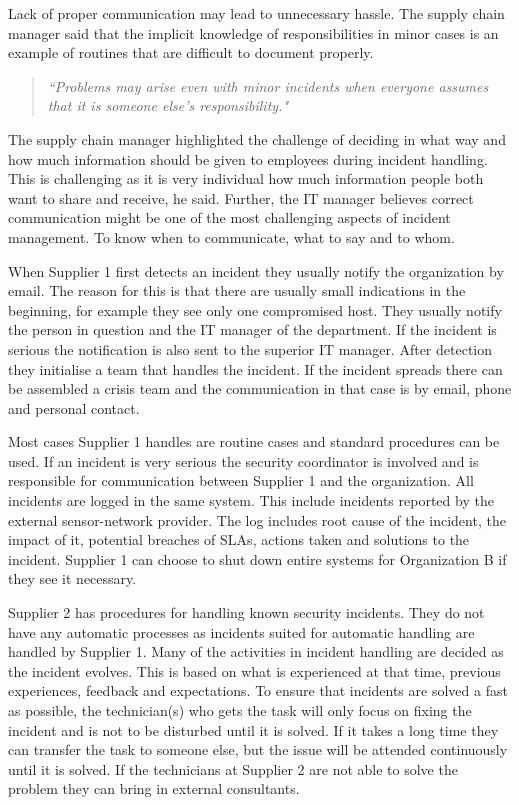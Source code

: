 \documentclass[b5paper, twoside, openright, 11pt]{report}
\begin{document}
Lack of proper communication may lead to unnecessary hassle. The supply chain manager said that the implicit knowledge of responsibilities in minor cases is an example of routines that are difficult to document properly.

\begin{quote}
\textit{``Problems may arise even with minor incidents when everyone assumes that it is someone else's responsibility."}
\end{quote}

The supply chain manager highlighted the challenge of deciding in what way and how much information should be given to employees during incident handling. This is challenging as it is very individual how much information people both want to share and receive, he said. Further, the IT manager believes correct communication might be one of the most challenging aspects of incident management. To know when to communicate, what to say and to whom. 

When Supplier 1 first detects an incident they usually notify the organization by email. The reason for this is that there are usually small indications in the beginning, for example they see only one compromised host. They usually notify the person in question and the IT manager of the department. If the incident is serious the notification is also sent to the superior IT manager. After detection they initialise a team that handles the incident. If the incident spreads there can be assembled a crisis team and the communication in that case is by email, phone and personal contact. 

Most cases Supplier 1 handles are routine cases and standard procedures can be used. If an incident is very serious the security coordinator is involved and is responsible for communication between Supplier 1 and the organization. All incidents are logged in the same system. This include incidents reported by the external sensor-network provider. The log includes root cause of the incident, the impact of it, potential breaches of \acp{SLA}, actions taken and solutions to the incident. Supplier 1 can choose to shut down entire systems for Organization B if they see it necessary.

Supplier 2 has procedures for handling known security incidents. They do not have any automatic processes as incidents suited for automatic handling are handled by Supplier 1. Many of the activities in incident handling are decided as the incident evolves. This is based on what is experienced at that time, previous experiences, feedback and expectations. To ensure that incidents are solved a fast as possible, the technician(s) who gets the task will only focus on fixing the incident and is not to be disturbed until it is solved. If it takes a long time they can transfer the task to someone else, but the issue will be attended continuously until it is solved. If the technicians at Supplier 2 are not able to solve the problem they can bring in external consultants.
\end{document}
